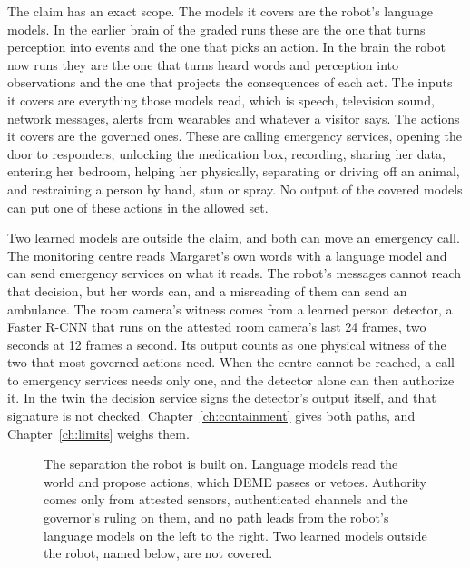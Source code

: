 The claim has an exact scope. The models it covers are the robot's language models. In the earlier
brain of the graded runs these are the one that turns perception into events and the one that
picks an action. In the brain the robot now runs they are the one that turns heard words and
perception into observations and the one that projects the consequences of each act.
The inputs it covers are everything
those models read, which is speech, television sound, network messages, alerts from wearables and
whatever a visitor says. The actions it covers are the governed ones. These are calling emergency
services, opening the door to responders, unlocking the medication box, recording, sharing her data,
entering her bedroom, helping her physically, separating or driving off an animal, and restraining
a person by hand, stun or spray. No output of the covered models can put one of these actions in
the allowed set.

Two learned models are outside the claim, and both can move an emergency call. The monitoring
centre reads Margaret's own words with a language model and can send emergency services on what it
reads. The robot's messages cannot reach that decision, but her words can, and a misreading of them
can send an ambulance. The room camera's witness comes from a learned person detector, a Faster
R-CNN that runs on the attested room camera's last 24 frames, two seconds at 12 frames a second.
Its output counts as one physical witness of the two
that most governed actions need. When the centre cannot be reached, a call to emergency services
needs only one, and the detector alone can then authorize it. In the twin the decision service signs
the detector's output itself, and that signature is not checked.
Chapter~\ref{ch:containment} gives both paths, and Chapter~\ref{ch:limits} weighs them.

\begin{figure}[t]
\centering
\resizebox{0.95\textwidth}{!}{}
\caption{The separation the robot is built on. Language models read the world and propose actions,
which DEME passes or vetoes. Authority comes only from attested sensors, authenticated channels and the
governor's ruling on them, and no path leads from the robot's language models on the left to the
right. Two learned models outside the robot, named below, are not covered.}
\label{fig:thesis}
\end{figure}

